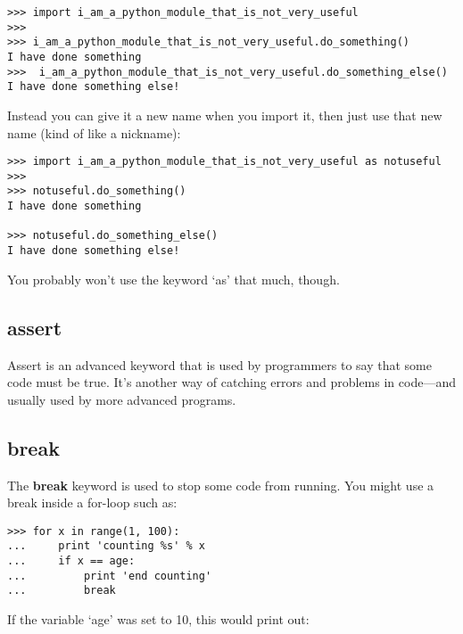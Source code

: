 \begin{listing}
\begin{verbatim}
>>> import i_am_a_python_module_that_is_not_very_useful
>>>
>>> i_am_a_python_module_that_is_not_very_useful.do_something()
I have done something
>>>  i_am_a_python_module_that_is_not_very_useful.do_something_else()
I have done something else!
\end{verbatim}
\end{listing}

\noindent
Instead you can give it a new name when you import it, then just use that new name (kind of like a nickname):

\begin{listing}
\begin{verbatim}
>>> import i_am_a_python_module_that_is_not_very_useful as notuseful
>>>
>>> notuseful.do_something()
I have done something

>>> notuseful.do_something_else()
I have done something else!
\end{verbatim}
\end{listing}

\noindent
You probably won't use the keyword `as' that much, though.

\subsection*{assert}

Assert is an advanced keyword that is used by programmers to say that some code must be true. It's another way of catching errors and problems in code---and usually used by more advanced programs.

\subsection*{break}

The \textbf{break} keyword is used to stop some code from running. You might use a break inside a for-loop such as:

\begin{listing}
\begin{verbatim}
>>> for x in range(1, 100):
...     print 'counting %s' % x
...     if x == age:
...         print 'end counting'
...         break
\end{verbatim}
\end{listing}

\noindent
If the variable `age' was set to 10, this would print out:


